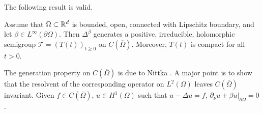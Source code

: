 The following result is valid.

\begin{theorem}[4.3]
Assume that $\Omega \subset \mathbb{R}^d$ is bounded, open, connected with Lipschitz boundary, and let $\beta \in L^\infty(\partial\Omega)$. Then $\Delta^\beta$ generates a positive, irreducible, holomorphic semigroup $\mathcal{T} = (T(t))_{t \geq 0}$ on $C(\overline{\Omega})$. Moreover, $T(t)$ is compact for all $t > 0$.
\end{theorem}

The generation property on $C(\overline{\Omega})$ is due to Nittka \cite{Ni11}. A major point is to show that the resolvent of the corresponding operator on $L^2(\Omega)$ leaves $C(\overline{\Omega})$ invariant. Given $f \in C(\overline{\Omega})$, $u \in H^1(\Omega)$ such that $u - \Delta u = f$, $\partial_\nu u + \beta u|_{\partial\Omega} = 0$.

